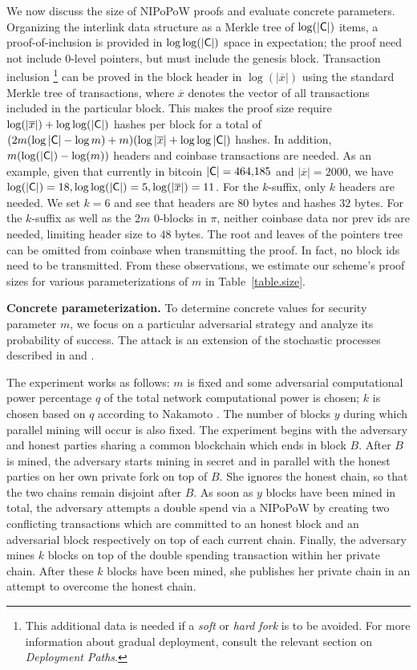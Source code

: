 We now discuss the size of NIPoPoW proofs and evaluate concrete parameters.
Organizing the interlink data structure as a Merkle tree of $\log(|\mathsf{C}|)$ items, a
proof-of-inclusion is provided in $\log \log(|\mathsf{C}|)$ space in expectation;
the proof need not include $0$-level pointers, but must include the genesis
block.
Transaction inclusion
\footnote{This additional data is needed if a \emph{soft} or \emph{hard fork} is
to be avoided. For more information about gradual deployment, consult the
relevant section on \emph{Deployment Paths}.}
can be proved in the block header in
$\log(|\overline x|)$ using the standard Merkle tree of transactions, where
$\overline x$ denotes the vector of all transactions included in the particular
block.
This makes the proof size require $\log(|\overline x|) +
\log\log(|\mathsf{C}|)$ hashes per block for a total of
$(2m (\log|\mathsf{C}| - \log{m}) + m)(\log|\overline x| + \log\log|\mathsf{C}|)$
hashes. In addition, $m
(\log(|\mathsf{C}|) - \log(m))$ headers and coinbase transactions are needed. As an
example, given that currently in bitcoin $|\mathsf{C}| = 464{,}185$ and $|\overline x|
= 2000$, we have $\log(|\mathsf{C}|) = 18, \log\log(|\mathsf{C}|) = 5, \log(|\overline
x|) = 11$. For the $k$-suffix, only $k$ headers are needed. We set $k = 6$ and
see that headers are $80$ bytes and hashes $32$ bytes. For the $k$-suffix as
well as the $2m$ $0$-blocks in $\pi$, neither coinbase data nor prev ids are
needed, limiting header size to $48$ bytes. The root and leaves of the pointers
tree can be omitted from coinbase when transmitting the proof. In fact, no block
ids need to be transmitted. From these observations, we estimate our scheme's
proof sizes for various parameterizations of $m$ in Table~\ref{table.size}.

\noindent
\textbf{Concrete parameterization.}
To determine concrete values for security parameter $m$, we focus on a
particular adversarial strategy and analyze its probability of success.
The attack is an extension of the stochastic processes described in
\cite{bitcoin} and \cite{rosenfeld}.

The experiment works as follows: $m$ is fixed and some adversarial computational
power percentage $q$ of the total network computational power is chosen; $k$ is
chosen based on $q$ according to Nakamoto \cite{bitcoin}. The number of blocks
$y$ during which parallel mining will occur is also fixed. The experiment begins
with the adversary and honest parties sharing a common blockchain which ends in
block $B$. After $B$ is mined, the adversary starts mining in secret and in
parallel with the honest parties on her own private fork on top of $B$. She
ignores the honest chain, so that the two chains remain disjoint after $B$. As
soon as $y$ blocks have been mined in total, the adversary attempts a double
spend via a NIPoPoW
by creating two conflicting transactions which are committed to an honest
block and an adversarial block respectively on top of each current chain.
Finally, the adversary mines $k$ blocks on top of the double spending
transaction within her private chain. After these $k$ blocks have been mined,
she publishes her private chain in an attempt to overcome the honest chain.


